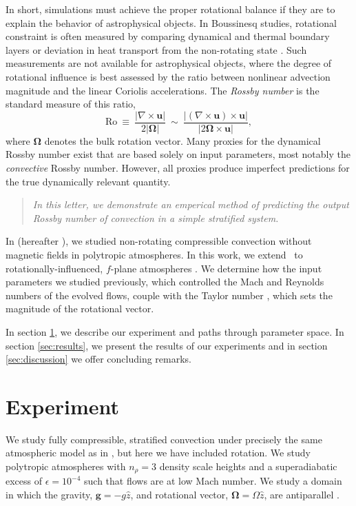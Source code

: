 \documentclass[twocolumn, amsmath, amsfonts, amssymb, trackchanges]{aastex62}
\begin{document}
In short, simulations must achieve the proper rotational balance if they are to explain 
the behavior of astrophysical objects. 
In Boussinesq studies, rotational constraint is often measured by comparing
dynamical and thermal boundary layers or deviation in heat transport from the non-rotating
state \citep{king&all2012, julien&all2012, king&all2013}. 
Such measurements are not available for astrophysical objects, where
the degree of rotational influence is best assessed by the ratio between 
nonlinear advection magnitude and the linear Coriolis accelerations. 
The \textit{Rossby number} is the standard measure of this ratio, 
\begin{equation}
\text{Ro} \ \equiv \ \frac{| \nabla \times \boldsymbol{u} | }{2 |\bm{\Omega}|} \ 
\sim \ \frac{| (\nabla \times \boldsymbol{u}) \times \boldsymbol{u}  | }{|2 \bm{\Omega} \times \boldsymbol{u}|},
\label{eqn:rossby-def}
\end{equation}
where $\bm{\Omega}$ denotes the bulk rotation vector. 
Many proxies for the dynamical Rossby number exist that are based solely on input parameters, most notably the \textit{convective} Rossby number. 
However, all proxies produce imperfect predictions for the true dynamically relevant quantity.
\begin{quote}
\emph{In this letter, we demonstrate an emperical method of predicting the output Rossby number
of convection in a simple stratified system.}
\end{quote}
In \cite{anders&brown2017} (hereafter \AB), we studied non-rotating compressible convection without magnetic fields in polytropic atmospheres. 
In this work, we extend \AB$\,$ to rotationally-influenced, $f$-plane
atmospheres 
\cite[e.g.,][]{brummell&all1996, brummell&all1998, calkins&all2015a}. 
We determine how the input parameters we studied previously, which controlled the Mach and
Reynolds numbers of the evolved flows, couple with the Taylor number \citep[Ta,][]{julien&all1996}, which sets the magnitude of the rotational vector. 

In section  \ref{sec:experiment}, we describe our experiment and paths through parameter space. 
In section \ref{sec:results}, we present the results of our experiments and in section \ref{sec:discussion} we offer concluding remarks.

\section{Experiment} 
\label{sec:experiment}
We study fully compressible, stratified 
convection under precisely the same atmospheric model
as in \AB, but here
we have included rotation. We study polytropic atmospheres
with $n_\rho = 3$ density scale heights and a superadiabatic
excess of $\epsilon = 10^{-4}$ such that flows are at low Mach number.
We study a domain in which the
gravity, $\bm{g} = -g\hat{z}$, and rotational vector, $\bm{\Omega} = \Omega \hat{z}$, 
are antiparallel \citep[as in e.g.,][]{julien&all1996, brummell&all1996}.
\end{document}
